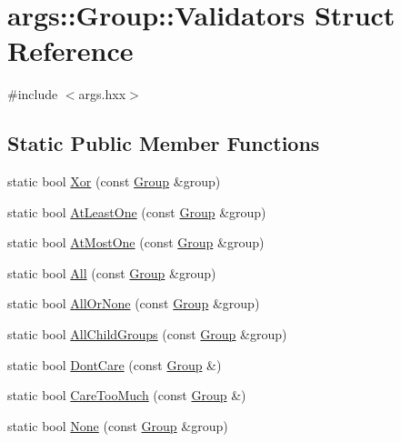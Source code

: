 \hypertarget{structargs_1_1_group_1_1_validators}{}\section{args\+:\+:Group\+:\+:Validators Struct Reference}
\label{structargs_1_1_group_1_1_validators}


{\ttfamily \#include $<$args.\+hxx$>$}

\subsection*{Static Public Member Functions}
\begin{DoxyCompactItemize}
\item 
static bool \hyperlink{structargs_1_1_group_1_1_validators_a7fcc24c227a52d1ec07a9abfb08e72b6}{Xor} (const \hyperlink{classargs_1_1_group}{Group} \&group)
\item 
static bool \hyperlink{structargs_1_1_group_1_1_validators_aaffeaa9014b817ac0f991f4a1160e200}{At\+Least\+One} (const \hyperlink{classargs_1_1_group}{Group} \&group)
\item 
static bool \hyperlink{structargs_1_1_group_1_1_validators_a2ba98505409f786976b8510c9872bb8d}{At\+Most\+One} (const \hyperlink{classargs_1_1_group}{Group} \&group)
\item 
static bool \hyperlink{structargs_1_1_group_1_1_validators_a0210690955dc4df891d6ff378a2d7f04}{All} (const \hyperlink{classargs_1_1_group}{Group} \&group)
\item 
static bool \hyperlink{structargs_1_1_group_1_1_validators_ac3a812ba1cbd689f039ed5928156d86e}{All\+Or\+None} (const \hyperlink{classargs_1_1_group}{Group} \&group)
\item 
static bool \hyperlink{structargs_1_1_group_1_1_validators_a19277251ebbf19e7b4df034223c8bf6f}{All\+Child\+Groups} (const \hyperlink{classargs_1_1_group}{Group} \&group)
\item 
static bool \hyperlink{structargs_1_1_group_1_1_validators_adf7a904f8fa0d4ea9f1c47ea057a5417}{Dont\+Care} (const \hyperlink{classargs_1_1_group}{Group} \&)
\item 
static bool \hyperlink{structargs_1_1_group_1_1_validators_a93ff25480fad303ccb9c895cd4608b2f}{Care\+Too\+Much} (const \hyperlink{classargs_1_1_group}{Group} \&)
\item 
static bool \hyperlink{structargs_1_1_group_1_1_validators_a5337b5d040a1287606d4d7ba1b5189fc}{None} (const \hyperlink{classargs_1_1_group}{Group} \&group)
\end{DoxyCompactItemize}


